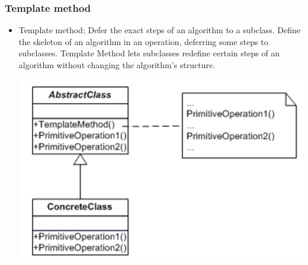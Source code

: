\documentclass[a4paper,12pt,twoside]{book}
\begin{document}
\subsubsection{Template method}
\begin{itemize}
\item Template method: Defer the exact steps of an algorithm to a subclass. Define the skeleton of an algorithm in an operation, deferring some steps to subclasses. Template Method lets subclasses redefine certain steps of an algorithm without changing the algorithm’s structure.

\includegraphics[scale=0.75]{pics/template.png}

\end{itemize}




\ifx \allfiles \undefined
\end{document}
